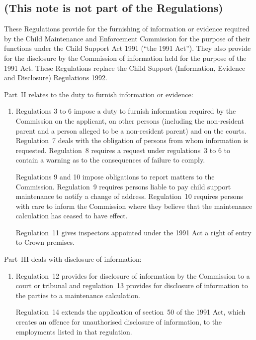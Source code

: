 \documentclass[12pt,a4paper]{article}
\begin{document}
\renewcommand\parthead{— Explanatory Note}

\subsection*{(This note is not part of the Regulations)}

These Regulations provide for the furnishing of information or evidence required by the Child Maintenance and Enforcement Commission for the purpose of their functions under the Child Support Act 1991 (“the 1991 Act”). They also provide for the disclosure by the Commission of information held for the purpose of the 1991 Act. These Regulations replace the Child Support (Information, Evidence and Disclosure) Regulations 1992.

Part~II relates to the duty to furnish information or evidence:
\begin{enumerate}\item[]
Regulations 3 to 6 impose a duty to furnish information required by the Commission on the applicant, on other persons (including the non-resident parent and a person alleged to be a non-resident parent) and on the courts. Regulation~7 deals with the obligation of persons from whom information is requested. Regulation~8 requires a request under regulations~3 to 6 to contain a warning as to the consequences of failure to comply.

Regulations 9 and 10 impose obligations to report matters to the Commission. Regulation~9 requires persons liable to pay child support maintenance to notify a change of address. Regulation~10 requires persons with care to inform the Commission where they believe that the maintenance calculation has ceased to have effect.

Regulation~11 gives inspectors appointed under the 1991 Act a right of entry to Crown premises.
\end{enumerate}

Part~III deals with disclosure of information:
\begin{enumerate}\item[]
Regulation~12 provides for disclosure of information by the Commission to a court or tribunal and regulation~13 provides for disclosure of information to the parties to a maintenance calculation.

Regulation~14 extends the application of section~50 of the 1991 Act, which creates an offence for unauthorised disclosure of information, to the employments listed in that regulation.
\end{enumerate}
\end{document}
